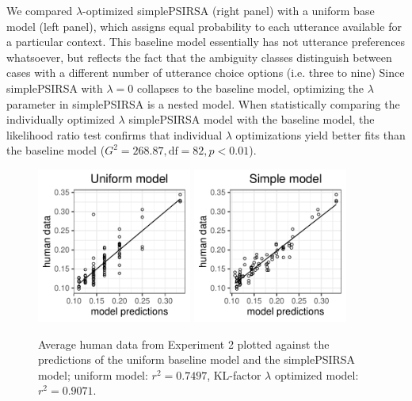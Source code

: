 \documentclass[10pt,a4paper]{article}
\newcommand{\gcs}[1]{\textcolor{blue}{[gcs: #1]}}
\begin{document}
We compared $\lambda$-optimized simplePSIRSA (right panel) with a uniform base model (left panel), which assigns equal probability to each utterance available for a particular context.
This baseline model essentially has not utterance  preferences whatsoever, but reflects the fact that the ambiguity classes distinguish between cases with a different number of utterance choice options (i.e. three to nine)
 Since simplePSIRSA with $\lambda=0$ collapses to the baseline model, optimizing the $\lambda$ parameter in simplePSIRSA is a nested model. 
 When statistically comparing the individually optimized $\lambda$ simplePSIRSA model with the baseline model, the likelihood ratio test confirms that individual $\lambda$ optimizations yield better fits than the baseline model ($G^2 = 268.87, \textrm{df} = 82, p <0.01$).

\begin{figure}[ht]
	\centering
	\includegraphics[width=2in]{images/x3_m20.pdf}
	\includegraphics[width=2in]{images/x3_m11.pdf}
	\caption{Average human data from Experiment 2 plotted against the predictions of the uniform baseline model and the simplePSIRSA model; uniform model: $r^{2}=0.7497$, KL-factor $\lambda$ optimized model: $r^{2}=0.9071$. }\label{kl-factor}
\end{figure}
\end{document}
